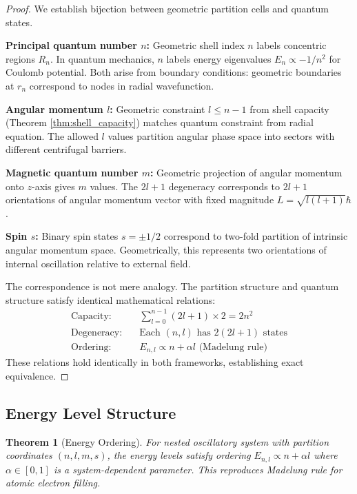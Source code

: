 \documentclass[twocolumn,10pt]{article}
\newtheorem{theorem}{Theorem}[section]
\begin{document}
\begin{proof}
We establish bijection between geometric partition cells and quantum states.

\textbf{Principal quantum number $n$:} Geometric shell index $n$ labels concentric regions $R_n$. In quantum mechanics, $n$ labels energy eigenvalues $E_n \propto -1/n^2$ for Coulomb potential. Both arise from boundary conditions: geometric boundaries at $r_n$ correspond to nodes in radial wavefunction.

\textbf{Angular momentum $l$:} Geometric constraint $l \leq n-1$ from shell capacity (Theorem \ref{thm:shell_capacity}) matches quantum constraint from radial equation. The allowed $l$ values partition angular phase space into sectors with different centrifugal barriers.

\textbf{Magnetic quantum number $m$:} Geometric projection of angular momentum onto $z$-axis gives $m$ values. The $2l+1$ degeneracy corresponds to $2l+1$ orientations of angular momentum vector with fixed magnitude $L = \sqrt{l(l+1)}\hbar$.

\textbf{Spin $s$:} Binary spin states $s = \pm 1/2$ correspond to two-fold partition of intrinsic angular momentum space. Geometrically, this represents two orientations of internal oscillation relative to external field.

The correspondence is not mere analogy. The partition structure and quantum structure satisfy identical mathematical relations:
\begin{align}
\text{Capacity:} \quad & \sum_{l=0}^{n-1} (2l+1) \times 2 = 2n^2 \\
\text{Degeneracy:} \quad & \text{Each } (n,l) \text{ has } 2(2l+1) \text{ states} \\
\text{Ordering:} \quad & E_{n,l} \propto n + \alpha l \text{ (Madelung rule)}
\end{align}
These relations hold identically in both frameworks, establishing exact equivalence.
\end{proof}

\subsection{Energy Level Structure}

\begin{theorem}[Energy Ordering]
\label{thm:energy_ordering}
For nested oscillatory system with partition coordinates $(n,l,m,s)$, the energy levels satisfy ordering $E_{n,l} \propto n + \alpha l$ where $\alpha \in [0,1]$ is a system-dependent parameter. This reproduces Madelung rule for atomic electron filling.
\end{theorem}
\end{document}
